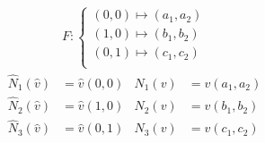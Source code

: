 \begin{beispiel}

\begin{align*}
F:\left\lbrace\begin{array}{l}
(0,0)\mapsto(a_1,a_2)\\
(1,0)\mapsto(b_1,b_2)\\
(0,1)\mapsto(c_1,c_2)\\
\end{array}\right.
\end{align*}
\begin{align*}
\hat{N}_1(\hat{v})&=\hat{v}(0,0) &N_1(v)&=v(a_1,a_2)\\
\hat{N}_2(\hat{v})&=\hat{v}(1,0) &N_2(v)&=v(b_1,b_2)\\
\hat{N}_3(\hat{v})&=\hat{v}(0,1) &N_3(v)&=v(c_1,c_2)\\
\end{align*}
\end{beispiel}
